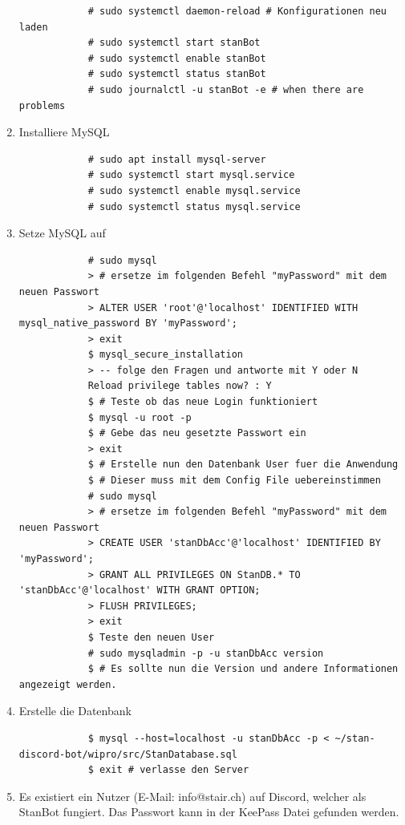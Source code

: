 \documentclass[a4paper, table]{article}
\begin{document}
\begin{enumerate}
\begin{lstlisting}
            # sudo systemctl daemon-reload # Konfigurationen neu laden
            # sudo systemctl start stanBot
            # sudo systemctl enable stanBot
            # sudo systemctl status stanBot
            # sudo journalctl -u stanBot -e # when there are problems
        \end{lstlisting}
    \item Installiere MySQL
        \begin{lstlisting}
            # sudo apt install mysql-server
            # sudo systemctl start mysql.service
            # sudo systemctl enable mysql.service
            # sudo systemctl status mysql.service
        \end{lstlisting}
    \item Setze MySQL auf
        \begin{lstlisting}
            # sudo mysql
            > # ersetze im folgenden Befehl "myPassword" mit dem neuen Passwort
            > ALTER USER 'root'@'localhost' IDENTIFIED WITH mysql_native_password BY 'myPassword';
            > exit
            $ mysql_secure_installation
            > -- folge den Fragen und antworte mit Y oder N
            Reload privilege tables now? : Y
            $ # Teste ob das neue Login funktioniert
            $ mysql -u root -p
            $ # Gebe das neu gesetzte Passwort ein
            > exit
            $ # Erstelle nun den Datenbank User fuer die Anwendung
            $ # Dieser muss mit dem Config File uebereinstimmen
            # sudo mysql
            > # ersetze im folgenden Befehl "myPassword" mit dem neuen Passwort
            > CREATE USER 'stanDbAcc'@'localhost' IDENTIFIED BY 'myPassword';
            > GRANT ALL PRIVILEGES ON StanDB.* TO 'stanDbAcc'@'localhost' WITH GRANT OPTION;
            > FLUSH PRIVILEGES;
            > exit
            $ Teste den neuen User
            # sudo mysqladmin -p -u stanDbAcc version
            $ # Es sollte nun die Version und andere Informationen angezeigt werden.
        \end{lstlisting}
    \item Erstelle die Datenbank
        \begin{lstlisting}
            $ mysql --host=localhost -u stanDbAcc -p < ~/stan-discord-bot/wipro/src/StanDatabase.sql
            $ exit # verlasse den Server
        \end{lstlisting}
    \item Es existiert ein Nutzer (E-Mail: info@stair.ch) auf Discord, welcher als StanBot fungiert. Das Passwort kann in der KeePass Datei gefunden werden.

\end{enumerate}
\end{document}

